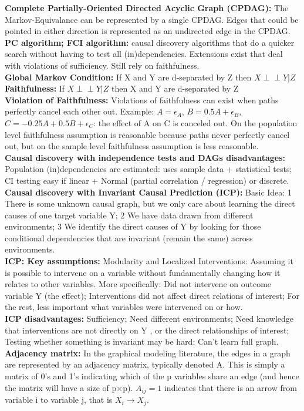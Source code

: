 \documentclass[a4paper,7pt,landscape]{extarticle}
\newcommand{\indep}{\perp \!\!\! \perp} %
\begin{document}
\begin{multicols}{3}
\begin{boxA}
\textbf{Complete Partially-Oriented Directed Acyclic Graph (CPDAG):} The Markov-Equivalance can be represented by a single CPDAG. Edges that could be pointed in either direction is represented as an undirected edge in the CPDAG.\\
\textbf{PC algorithm; FCI algorithm:} causal discovery algorithms that do a quicker search without having to test all (in)dependencies. Extensions exist that deal with violations of sufficiency. Still rely on faithfulness.\\
\textbf{Global Markov Condition:} If X and Y are d-separated by Z then $X \indep Y | Z$\\
\textbf{Faithfulness:} If $X \indep Y | Z$ then X and Y are d-separated by Z\\
\textbf{Violation of Faithfulness:} Violations of faithfulness can exist when paths perfectly cancel each other out. Example: $A = \epsilon_A$, $B = 0.5 A + \epsilon_B$, $C = -0.25A + 0.5B + \epsilon_C$: the effect of A on C is canceled out. On the population level faithfulness assumption is reasonable because paths never perfectly cancel out, but on the sample level faithfulness assumption is less reasonable.\\
\textbf{Causal discovery with independence tests and DAGs disadvantages:} Population (in)dependencies are estimated: uses sample data + statistical tests; CI testing easy if linear + Normal (partial correlation / regression) or discrete.\\
\textbf{Causal discovery with Invariant Causal Prediction (ICP):} Basic Idea: 1 There is some unknown causal graph, but we only care about learning the direct causes of one target variable Y; 2 We have data drawn from different environments; 3 We identify the direct causes of Y by looking for those conditional dependencies that are invariant (remain the same) across environments.\\
\textbf{ICP: Key assumptions:} Modularity and Localized Interventions:
Assuming it is possible to intervene on a variable without fundamentally changing how it relates to other variables. More specifically: Did not intervene on outcome variable Y (the effect); Interventions did not affect direct relations of interest; For the rest, less important what variables were intervened on or how.\\
\textbf{ICP disadvantages:} Sufficiency; Need different environments; Need knowledge that interventions are not directly on Y , or the direct relationships of
interest; Testing whether something is invariant may be hard; Can’t learn full graph.\\
\textbf{Adjacency matrix:} In the graphical modeling literature, the edges in a graph are represented by an adjacency matrix, typically denoted A. This is simply a matrix of 0’s and 1’s indicating which of the p variables share an edge (and hence the matrix will have a size of p×p). $A_{ij}=1$ indicates that there is an arrow from variable i to variable j, that is $X_i \rightarrow X_j$.


\end{boxA}
\end{multicols}
\end{document}
